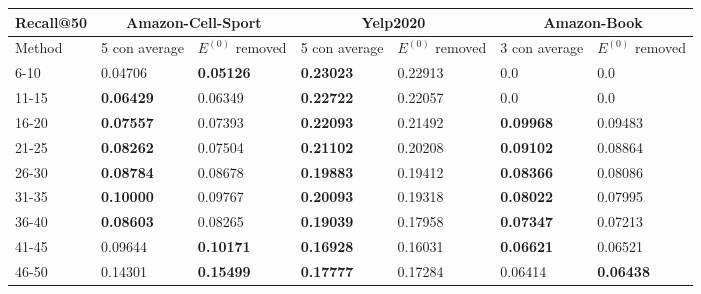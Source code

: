 \begin{table*}[h!]
    \centering
    \begin{tabular}{|l|l|l||l|l||l|l|}
        \hline
        Recall@50 & \multicolumn{2}{c||}{Amazon-Cell-Sport} & \multicolumn{2}{c||}{Yelp2020} & \multicolumn{2}{c|}{Amazon-Book}                                                            \\ \hline
        Method    & 5 con average                           & $E^{(0)}$ removed              & 5 con average                    & $E^{(0)}$ removed & 3 con average    & $E^{(0)}$ removed \\ \hline
        6-10      & 0.04706                                 & \textbf{0.05126}               & \textbf{0.23023}                 & 0.22913           & 0.0              & 0.0               \\ \hline
        11-15     & \textbf{0.06429}                        & 0.06349                        & \textbf{0.22722}                 & 0.22057           & 0.0              & 0.0               \\ \hline
        16-20     & \textbf{0.07557}                        & 0.07393                        & \textbf{0.22093}                 & 0.21492           & \textbf{0.09968} & 0.09483           \\ \hline
        21-25     & \textbf{0.08262}                        & 0.07504                        & \textbf{0.21102}                 & 0.20208           & \textbf{0.09102} & 0.08864           \\ \hline
        26-30     & \textbf{0.08784}                        & 0.08678                        & \textbf{0.19883}                 & 0.19412           & \textbf{0.08366} & 0.08086           \\ \hline
        31-35     & \textbf{0.10000}                        & 0.09767                        & \textbf{0.20093}                 & 0.19318           & \textbf{0.08022} & 0.07995           \\ \hline
        36-40     & \textbf{0.08603}                        & 0.08265                        & \textbf{0.19039}                 & 0.17958           & \textbf{0.07347} & 0.07213           \\ \hline
        41-45     & 0.09644                                 & \textbf{0.10171}               & \textbf{0.16928}                 & 0.16031           & \textbf{0.06621} & 0.06521           \\ \hline
        46-50     & 0.14301                                 & \textbf{0.15499}               & \textbf{0.17777}                 & 0.17284           & 0.06414          & \textbf{0.06438}  \\ \hline

\end{tabular}
\end{table*}
